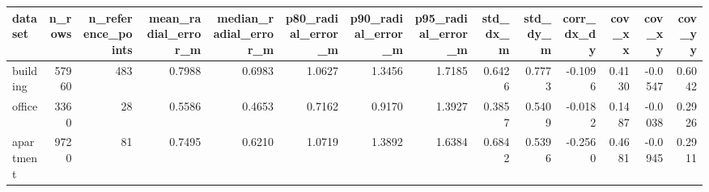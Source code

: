 \begin{tabular}{lrrrrrrrrrrrrr}
\toprule
dataset & n\_rows & n\_reference\_points & mean\_radial\_error\_m & median\_radial\_error\_m & p80\_radial\_error\_m & p90\_radial\_error\_m & p95\_radial\_error\_m & std\_dx\_m & std\_dy\_m & corr\_dx\_dy & cov\_xx & cov\_xy & cov\_yy \\
\midrule
building & 57960 & 483 & 0.7988 & 0.6983 & 1.0627 & 1.3456 & 1.7185 & 0.6426 & 0.7773 & -0.1096 & 0.4130 & -0.0547 & 0.6042 \\
office & 3360 & 28 & 0.5586 & 0.4653 & 0.7162 & 0.9170 & 1.3927 & 0.3857 & 0.5409 & -0.0182 & 0.1487 & -0.0038 & 0.2926 \\
apartment & 9720 & 81 & 0.7495 & 0.6210 & 1.0719 & 1.3892 & 1.6384 & 0.6842 & 0.5396 & -0.2560 & 0.4681 & -0.0945 & 0.2911 \\
\bottomrule
\end{tabular}

